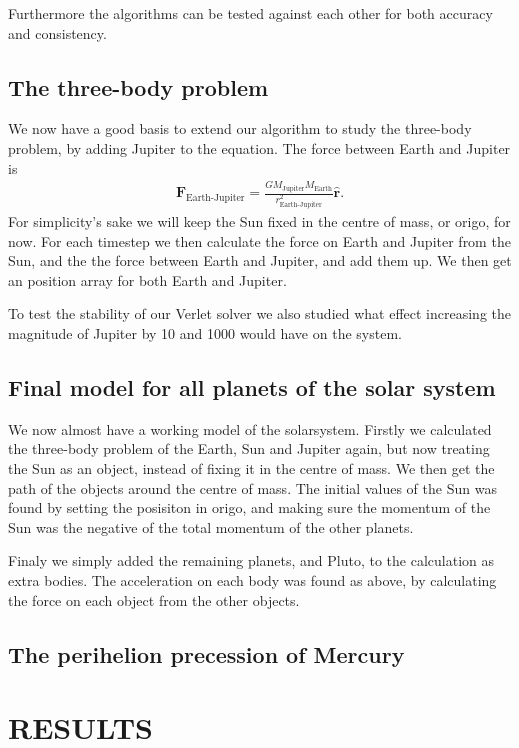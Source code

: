 \documentclass[a4paper]{article}
\begin{document}
Furthermore the algorithms can be tested against each other for both accuracy and consistency.
\subsection{The three-body problem}
We now have a good basis to extend our algorithm to study the three-body problem, by adding Jupiter to the equation. The force between Earth and Jupiter is
\begin{align}
\boldsymbol{F}_{\text{Earth-Jupiter}} = \frac{G M_\text{Jupiter} M_{\text{Earth}}} {r_{\text{Earth-Jupiter}}^{2}} \boldsymbol{\hat{r}}.
\end{align}
For simplicity's sake we will keep the Sun fixed in the centre of mass, or origo, for now. For each timestep we then calculate the force on Earth and Jupiter from the Sun, and the the force between Earth and Jupiter, and add them up. We then get an position array for both Earth and Jupiter.

To test the stability of our Verlet solver we also studied what effect increasing the magnitude of Jupiter by 10 and 1000 would have on the system.

\subsection{Final model for all planets of the solar system}
We now almost have a working model of the solarsystem. Firstly we calculated the three-body problem of the Earth, Sun and Jupiter again, but now treating the Sun as an object, instead of fixing it in the centre of mass. We then get the path of the objects around the centre of mass. The initial values of the Sun was found by setting the posisiton in origo, and making sure the momentum of the Sun was the negative of the total momentum of the other planets. 

Finaly we simply added the remaining planets, and Pluto, to the calculation as extra bodies. The acceleration on each body was found as above, by calculating the force on each object from the other objects. 


\subsection{The perihelion precession of Mercury}



\section{RESULTS}
\end{document}
